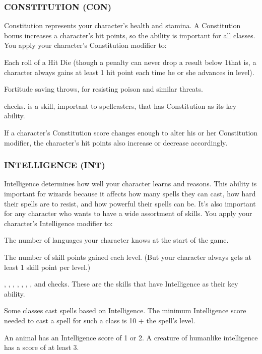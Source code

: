 \subsubsection{CONSTITUTION (CON)}

Constitution represents your character's health and stamina. A Constitution bonus increases a character's hit points, so the ability is important for all classes.
You apply your character's Constitution modifier to:
\begin{itemize*}
	\item Each roll of a Hit Die (though a penalty can never drop a result below 1\textendash that is, a character always gains at least 1 hit point each time he or she advances in level).
	\item Fortitude saving throws, for resisting poison and similar threats.
	\item {} checks.  is a skill, important to spellcasters, that has Constitution as its key ability.
	\item If a character's Constitution score changes enough to alter his or her Constitution modifier, the character's hit points also increase or decrease accordingly.
\end{itemize*}

\subsubsection{INTELLIGENCE (INT)}

Intelligence determines how well your character learns and reasons. This ability is important for wizards because it affects how many spells they can cast, how hard their spells are to resist, and how powerful their spells can be. It's also important for any character who wants to have a wide assortment of skills.
You apply your character's Intelligence modifier to:
\begin{itemize*}
	\item The number of languages your character knows at the start of the game.
	\item The number of skill points gained each level. (But your character always gets at least 1 skill point per level.)
	\item {}, , , , , , , and  checks. These are the skills that have Intelligence as their key ability.
	\item Some classes cast spells based on Intelligence.  The minimum Intelligence score needed to cast a spell for such a class is 10 + the spell's level.
	\item An animal has an Intelligence score of 1 or 2. A creature of humanlike intelligence has a score of at least 3.
\end{itemize*}


